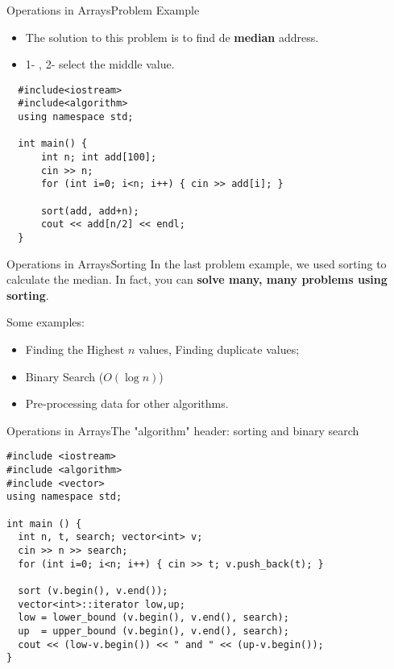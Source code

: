 \begin{frame}[fragile]{Operations in Arrays}{Problem Example}

  \begin{itemize}
  \item The solution to this problem is to find de {\bf median} address.
  \item 1- , 2- select the middle value.
  \end{itemize}

\begin{verbatim}
  #include<iostream>
  #include<algorithm>
  using namespace std;

  int main() {
      int n; int add[100];
      cin >> n;
      for (int i=0; i<n; i++) { cin >> add[i]; }

      sort(add, add+n);
      cout << add[n/2] << endl;
  }
\end{verbatim}
\end{frame}

\begin{frame}{Operations in Arrays}{Sorting}
  In the last problem example, we used sorting to calculate the median. In fact, you can {\bf solve many, many problems using sorting}.\bigskip

  Some examples:
  \begin{itemize}
  \item Finding the Highest $n$ values, Finding duplicate values;
    \bigskip

  \item Binary Search ($O(\log n)$)
    \bigskip

  \item Pre-processing data for other algorithms.
  \end{itemize}
\end{frame}

\begin{frame}[fragile]{Operations in Arrays}{The "algorithm" header: sorting and binary search}
{\small
\begin{block}{}
\begin{verbatim}
#include <iostream>
#include <algorithm>
#include <vector>
using namespace std;

int main () {
  int n, t, search; vector<int> v;
  cin >> n >> search;
  for (int i=0; i<n; i++) { cin >> t; v.push_back(t); }

  sort (v.begin(), v.end());
  vector<int>::iterator low,up;
  low = lower_bound (v.begin(), v.end(), search);
  up  = upper_bound (v.begin(), v.end(), search);
  cout << (low-v.begin()) << " and " << (up-v.begin());
}
\end{verbatim}
\end{block}}
\end{frame}


